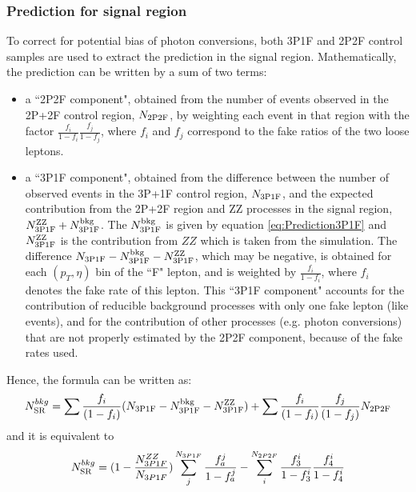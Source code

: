 \subsubsection{Prediction for signal region}
To correct for potential bias of photon conversions, both 3P1F and 2P2F control samples are used to extract the \zx prediction 
in the signal region. Mathematically, the prediction can be written by a sum of two terms:
\begin{itemize}
\item a ``2P2F component", obtained from the number of
  events observed in the 2P+2F control region, $N_{\rm 2P2F}$, by
  weighting each event in that region with the factor
  $\frac{f_{i}}{1-f_{i}} \frac{f_{j}}{1-f_{j}}$, where $f_{i}$ and
  $f_{j}$ correspond to the fake ratios of the two loose leptons.
\item a ``3P1F component", obtained from the
   difference between the number of observed events in the 3P+1F control
   region, $N_{\rm 3P1F}$, and the expected contribution from the 2P+2F
   region and ZZ processes in the signal region, $N^{\rm ZZ}_{\rm 3P1F} +
   N^{\rm bkg}_{\rm 3P1F}$. The $N^{\rm bkg}_{\rm 3P1F}$ is given by 
   equation \ref{eq:Prediction3P1F} and $N^{\rm ZZ}_{\rm 3P1F}$ is the
   contribution from $ZZ$ which is taken from the simulation. 
   The difference $N_{\rm 3P1F} -  N^{\rm bkg}_{\rm 3P1F} - N^{\rm ZZ}_{\rm 3P1F}$,
   which may be negative,
   is obtained for each $(p_T, \eta)$ bin of the ``F" lepton, and is weighted 
   by $\frac{f_i} {1 - f_i}$, where $f_i$ denotes the fake rate of
   this lepton.
   This ``3P1F component" accounts for the contribution of reducible background
   processes with only one fake lepton (like \wz events), and for the contribution
   of other processes (e.g. photon conversions) that are not properly estimated
   by the 2P2F component, because of the fake rates used.
\end{itemize}
Hence, the formula can be written as:
\begin{equation} 
\label{eq:PredictionSR}
N^{bkg}_{\rm SR} = \sum \frac{f_{i}}{(1-f_{i})} (N_{\rm 3P1F} - N^{\rm
bkg}_{\rm 3P1F} - N^{\rm ZZ}_{\rm 3P1F})
+ \sum \frac{f_{i}}{(1-f_{i})} \frac{f_{j}}{(1-f_{j})}N_{\rm 2P2F} \end{equation}
and it is equivalent to
\begin{equation}
\label{eq:PredictionSR2}
N^{bkg}_{\rm SR}= (1-\frac{N_{3P1F}^{ZZ}}{N_{3P1F}})\sum_j^{N_{3P1F}}\frac{f_a^j}{1-f_a^j} - \sum_i^{N_{2P2F}}\frac{f_3^i}{1-f_3^i}\frac{f_4^i}{1-f_4^i}
\end{equation}

